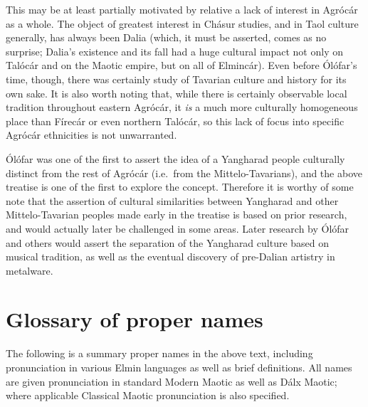 \documentclass{article}
\begin{document}
This may be at least partially motivated by relative a lack of interest in Agrócár as a whole. The object of greatest interest in Chásur studies, and in Taol culture generally, has always been Dalia (which, it must be asserted, comes as no surprise; Dalia's existence and its fall had a huge cultural impact not only on Talócár and on the Maotic empire, but on all of Elmincár). Even before Ólófar's time, though, there was certainly study of Tavarian culture and history for its own sake. It is also worth noting that, while there is certainly observable local tradition throughout eastern Agrócár, it \emph{is} a much more culturally homogeneous place than Fírecár or even northern Talócár, so this lack of focus into specific Agrócár ethnicities is not unwarranted.

Ólófar was one of the first to assert the idea of a Yangharad people culturally distinct from the rest of Agrócár (i.e.\ from the Mittelo-Tavarians), and the above treatise is one of the first to explore the concept. Therefore it is worthy of some note that the assertion of cultural similarities between Yangharad and other Mittelo-Tavarian peoples made early in the treatise is based on prior research, and would actually later be challenged in some areas. Later research by Ólófar and others would assert the separation of the Yangharad culture based on musical tradition, as well as the eventual discovery of pre-Dalian artistry in metalware.

\appendix
\pagebreak
\section{Glossary of proper names}

The following is a summary proper names in the above text, including pronunciation in various Elmin languages as well as brief definitions. All names are given pronunciation in standard Modern Maotic as well as Dálx Maotic; where applicable Classical Maotic pronunciation is also specified.
\end{document}
